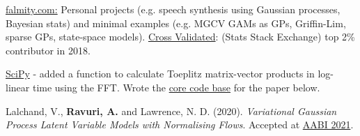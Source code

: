 

\begin{cvskills}

  {\href{https://www.falmity.com}{falmity.com:} Personal projects (e.g. speech synthesis using Gaussian processes, Bayesian stats) and minimal examples (e.g. MGCV GAMs as GPs, Griffin-Lim, sparse GPs, state-space models). \href{https://stats.stackexchange.com/users/211930/infprobscix}{Cross Validated}: (Stats Stack Exchange) top 2\% contributor in 2018.}

  {\href{https://github.com/scipy/scipy/blob/v1.6.0/scipy/linalg/basic.py}{SciPy} - added a function to calculate Toeplitz matrix-vector products in log-linear time using the FFT. \newline Wrote the \href{https://github.com/InfProbSciX/GPLVFs}{core code base} for the paper below.}

  {Lalchand, V., \textbf{Ravuri, A.} and Lawrence, N. D. (2020). \textit{Variational Gaussian Process Latent Variable Models with Normalising Flows}. Accepted at \href{https://openreview.net/pdf?id=zaMwvOjsyym}{AABI 2021}.}


\end{cvskills}




